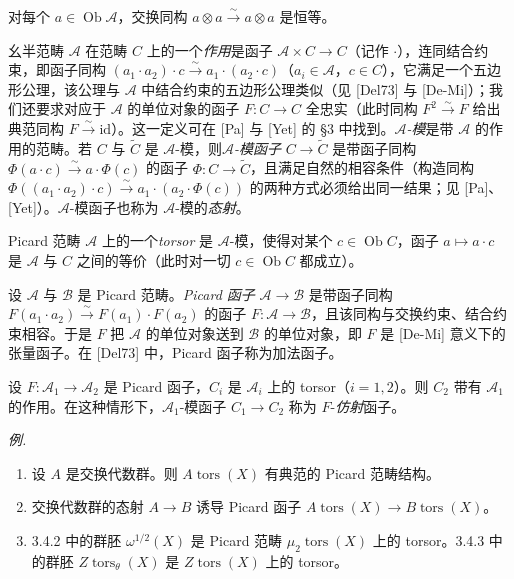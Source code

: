 对每个 $a\in\operatorname{Ob}\mathcal{A}$，交换同构 $a\otimes a\xrightarrow{\sim}a\otimes a$ 是恒等。

幺半范畴 $\mathcal{A}$ 在范畴 $C$ 上的一个\emph{作用}是函子 $\mathcal{A}\times C\to C$（记作 $\cdot$），连同结合约束，即函子同构 $(a_{1}\cdot a_{2})\cdot c\xrightarrow{\sim}a_{1}\cdot(a_{2}\cdot c)$（$a_{i}\in\mathcal{A}$，$c\in C$），它满足一个五边形公理，该公理与 $\mathcal{A}$ 中结合约束的五边形公理类似（见 [Del73] 与 [De-Mi]）；我们还要求对应于 $\mathcal{A}$ 的单位对象的函子 $F:C\to C$ 全忠实（此时同构 $F^{2}\xrightarrow{\sim}F$ 给出典范同构 $F\xrightarrow{\sim}\mathrm{id}$）。这一定义可在 [Pa] 与 [Yet] 的 §3 中找到。\emph{$\mathcal{A}$-模}是带 $\mathcal{A}$ 的作用的范畴。若 $C$ 与 $\widetilde{C}$ 是 $\mathcal{A}$-模，则\emph{$\mathcal{A}$-模函子} $C\to\widetilde{C}$ 是带函子同构 $\Phi(a\cdot c)\xrightarrow{\sim}a\cdot\Phi(c)$ 的函子 $\Phi:C\to\widetilde{C}$，且满足自然的相容条件（构造同构 $\Phi((a_{1}\cdot a_{2})\cdot c)\xrightarrow{\sim}a_{1}\cdot(a_{2}\cdot\Phi(c))$ 的两种方式必须给出同一结果；见 [Pa]、[Yet]）。$\mathcal{A}$-模函子也称为 $\mathcal{A}$-模的\emph{态射}。

Picard 范畴 $\mathcal{A}$ 上的一个\emph{torsor} 是 $\mathcal{A}$-模，使得对某个 $c\in\operatorname{Ob}C$，函子 $a\mapsto a\cdot c$ 是 $\mathcal{A}$ 与 $C$ 之间的等价（此时对一切 $c\in\operatorname{Ob}C$ 都成立）。

设 $\mathcal{A}$ 与 $\mathcal{B}$ 是 Picard 范畴。\emph{Picard 函子} $\mathcal{A}\to\mathcal{B}$ 是带函子同构 $F(a_{1}\cdot a_{2})\xrightarrow{\sim}F(a_{1})\cdot F(a_{2})$ 的函子 $F:\mathcal{A}\to\mathcal{B}$，且该同构与交换约束、结合约束相容。于是 $F$ 把 $\mathcal{A}$ 的单位对象送到 $\mathcal{B}$ 的单位对象，即 $F$ 是 [De-Mi] 意义下的张量函子。在 [Del73] 中，Picard 函子称为加法函子。

设 $F:\mathcal{A}_{1}\to\mathcal{A}_{2}$ 是 Picard 函子，$C_{i}$ 是 $\mathcal{A}_{i}$ 上的 torsor（$i=1,2$）。则 $C_{2}$ 带有 $\mathcal{A}_{1}$ 的作用。在这种情形下，$\mathcal{A}_{1}$-模函子 $C_{1}\to C_{2}$ 称为 $F$-\emph{仿射}函子。

\emph{例.}
\begin{enumerate}[label=\arabic*),leftmargin=2.2em]
  \item 设 $A$ 是交换代数群。则 $A\operatorname{tors}(X)$ 有典范的 Picard 范畴结构。

  \item 交换代数群的态射 $A\to B$ 诱导 Picard 函子 $A\operatorname{tors}(X)\to B\operatorname{tors}(X)$。
  \item 3.4.2 中的群胚 $\omega^{1/2}(X)$ 是 Picard 范畴 $\mu_{2}\operatorname{tors}(X)$ 上的 torsor。3.4.3 中的群胚 $Z\operatorname{tors}_{\theta}(X)$ 是 $Z\operatorname{tors}(X)$ 上的 torsor。
\end{enumerate}

